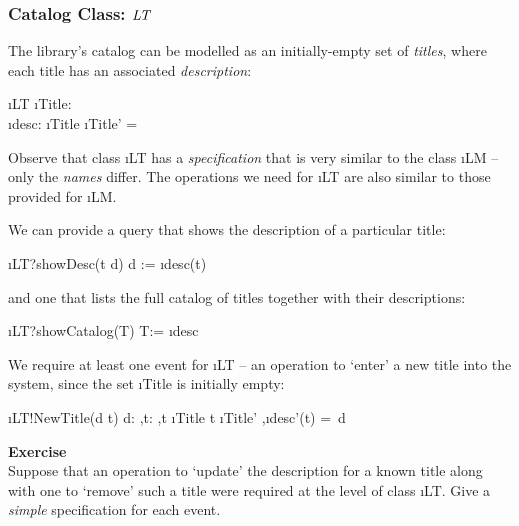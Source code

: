 \documentclass[12pt,a4paper]{article}
\newcounter{exer} %
\newcommand{\exer} %
	{\stepcounter{exer}{\;\arabic{exer}}}
\begin{document}
\subsubsection*{Catalog Class: $\mathit{LT}$}

The library's catalog can be modelled as an
initially-empty set of \emph{titles},
where each title has an associated \emph{description}:
\begin{showspecs}
	\begin{spec}{\i{LT}}
		\i{Title}: \;\\
		\i{desc}: \i{Title} \tfun {}
	\post	\i{Title'} = \emptyset
	\end{spec}
\end{showspecs}
\noindent Observe that class \i{LT} has a
\emph{specification} that is very similar to the class \i{LM} -- only the \emph{names}
differ. The operations we need for \i{LT} are also similar to those provided for \i{LM}.

\medskip\noindent We can provide a query that shows the description of a particular title:
\begin{showspecs}
	\begin{spec}{\i{LT?showDesc(t \to d)}}
		d := \i{desc}(t)
	\end{spec}
\end{showspecs}
\noindent and one that lists the full catalog of titles together with their descriptions:
\begin{showspecs}
	\begin{spec}{\i{LT?showCatalog(\to T)}}
		T:= \i{desc}
	\end{spec}
\end{showspecs}

\newpage

\medskip\noindent We require at least one event for \i{LT}
-- an operation to `enter' a new title into the system, since the set \i{Title} is initially empty:
\begin{showspecs}
	\begin{spec}{\i{LT!NewTitle(d \to t)}}
		d: \sep t:  \sep t \notin\i{Title}
	\post	t \in \i{Title'} \sep \i{desc'}(t) =\, d
	\end{spec}
\end{showspecs}
\medskip\noindent
\textbf{Exercise}\exer\\
Suppose that an operation to `update' the description for
a known title along with one to `remove' such
a title were required at the level of class
\i{LT}. Give a \emph{simple} specification for each event.
\end{document}
